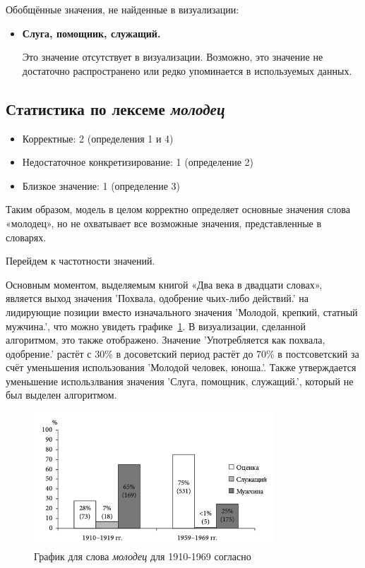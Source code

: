 Обобщённые значения, не найденные в визуализации:

\begin{itemize}
    \item \textbf{Слуга, помощник, служащий.}

    Это значение отсутствует в визуализации.
    Возможно, это значение не достаточно распространено или редко упоминается в используемых данных.
\end{itemize}

\subsection*{Статистика по лексеме \textit{молодец}}
\begin{itemize}
    \item Корректные: 2 (определения 1 и 4)
    \item Недостаточное конкретизирование: 1 (определение 2)
    \item Близкое значение: 1 (определение 3)
\end{itemize}

Таким образом, модель в целом корректно определяет основные значения слова «молодец»,
но не охватывает все возможные значения, представленные в словарях.

Перейдем к частотности значений.

Основным моментом, выделяемым книгой «Два века в двадцати словах», является
выход значения ’Похвала, одобрение чьих-либо действий.’ на лидирующие позиции
вместо изначального значения ’Молодой, крепкий, статный мужчина.’, что можно увидеть
графике~\ref{fig:TwoCenturiesMolodets}.
В визуализации, сделанной алгоритмом, это также отображено.
Значение ’Употребляется как похвала, одобрение.’ растёт с 30\% в досоветский период
растёт до 70\% в постсоветский за счёт уменьшения использования ’Молодой человек, юноша.’.
Также утверждается уменьшение использлвания значения ’Слуга, помощник, служащий.’,
который не был выделен алгоритмом.

\begin{figure}[H]
    \centering %
    \includegraphics[width=0.8\textwidth]{img/book/molodets/1910-1969}
    \caption{График для слова \textit{молодец} для 1910-1969 согласно~\cite{TwoCenturies}}
    \label{fig:TwoCenturiesMolodets}
\end{figure}

